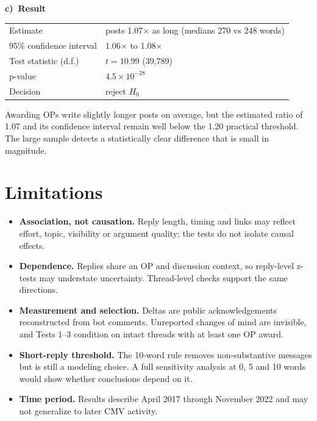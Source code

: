 \documentclass[10pt,a4paper,twocolumn]{article}
\newcommand{\tpart}[2]{\par\needspace{12\baselineskip}\smallskip\textbf{#1)~#2}\par}
\begin{document}
\tpart{c}{Result}
{\small
\begin{tabularx}{\linewidth}{@{}K{3.4cm} Y@{}}
\toprule
Estimate & posts 1.07$\times$ as long (medians 270 vs 248 words) \\
95\% confidence interval & 1.06$\times$ to 1.08$\times$ \\
Test statistic (d.f.) & $t=10.99$ (39{,}789) \\
p-value & $4.5\times10^{-28}$ \\
Decision & reject $H_0$ \\
\bottomrule
\end{tabularx}}

Awarding OPs write slightly longer posts on average, but the estimated ratio of 1.07 and its confidence interval remain well below the 1.20 practical threshold. The large sample detects a statistically clear difference that is small in magnitude.

\balance
\section{Limitations}
{\footnotesize
\begin{itemize}[leftmargin=1.1em,itemsep=1pt,topsep=1pt]
\item \textbf{Association, not causation.} Reply length, timing and links may reflect effort, topic, visibility or argument quality; the tests do not isolate causal effects.
\item \textbf{Dependence.} Replies share an OP and discussion context, so reply-level z-tests may understate uncertainty. Thread-level checks support the same directions.
\item \textbf{Measurement and selection.} Deltas are public acknowledgements reconstructed from bot comments. Unreported changes of mind are invisible, and Tests 1--3 condition on intact threads with at least one OP award.
\item \textbf{Short-reply threshold.} The 10-word rule removes non-substantive messages but is still a modeling choice. A full sensitivity analysis at 0, 5 and 10 words would show whether conclusions depend on it.
\item \textbf{Time period.} Results describe April 2017 through November 2022 and may not generalize to later CMV activity.
\end{itemize}}
\end{document}
